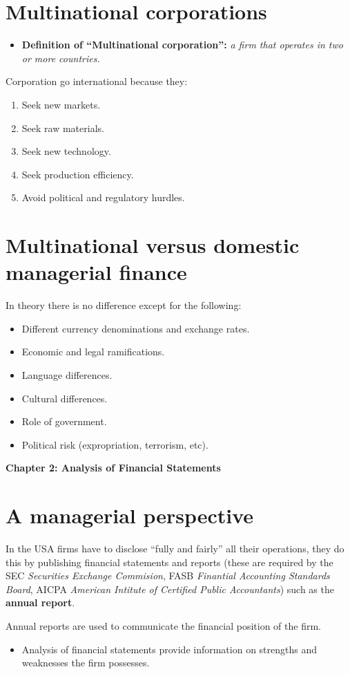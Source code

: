 \documentclass{article}
\renewcommand{\termdefinition}[2]{
    \textbf{Definition of ``#1'':} \emph{#2}
}
\begin{document}
\section{Multinational corporations}
\begin{itemize}
    \item \termdefinition{Multinational corporation}{ a firm that operates in two or more countries.} 
\end{itemize}
Corporation go international because they: 
\begin{enumerate}
    \item Seek new markets. 
    \item Seek raw materials.
    \item Seek new technology. 
    \item Seek production efficiency.
    \item Avoid political and regulatory hurdles. 
\end{enumerate}


\section{Multinational versus domestic managerial finance}
In theory there is no difference except for the following: 
\begin{itemize}
    \item Different currency denominations and exchange rates. 
    \item Economic and legal ramifications. 
    \item Language differences. 
    \item Cultural differences.
    \item Role of government. 
    \item Political risk (expropriation, terrorism, etc). 
\end{itemize}

{
    \LARGE\noindent \textbf{Chapter 2: Analysis of Financial Statements}
}

\section{A managerial perspective}
In the USA firms have to disclose ``fully and fairly'' all their operations, they do this by publishing financial statements and reports (these are required by the SEC \emph{Securities Exchange Commision}, FASB \emph{Finantial Accounting Standards Board}, AICPA \emph{American Intitute of Certified Public Accountants}) such as the \textbf{annual report}. \par 
Annual reports are used to communicate the financial position of the firm.
\begin{itemize}
    \item Analysis of financial statements provide information on strengths and weaknesses the firm possesses.
\end{itemize}
\end{document}

